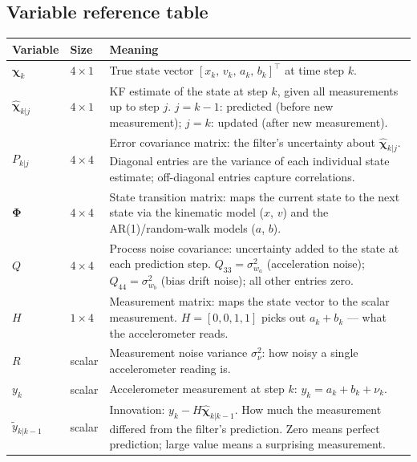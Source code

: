 \documentclass[12pt, a4paper]{article}
\begin{document}
\subsection*{Variable reference table}

\begin{center}
\renewcommand{\arraystretch}{1.5}
\begin{tabular}{p{2.8cm} p{2.0cm} p{8.5cm}}
  \toprule
  \textbf{Variable} & \textbf{Size} & \textbf{Meaning} \\
  \midrule
  $\boldsymbol{\chi}_k$
    & $4 \times 1$
    & True state vector $[x_k,\, v_k,\, a_k,\, b_k]^\top$ at time step $k$. \\
  $\hat{\boldsymbol{\chi}}_{k|j}$
    & $4 \times 1$
    & KF estimate of the state at step $k$, given all measurements up
      to step $j$.
      $j = k-1$: predicted (before new measurement);
      $j = k$: updated (after new measurement). \\
  $P_{k|j}$
    & $4 \times 4$
    & Error covariance matrix: the filter's uncertainty about
      $\hat{\boldsymbol{\chi}}_{k|j}$.
      Diagonal entries are the variance of each individual state
      estimate; off-diagonal entries capture correlations. \\
  $\boldsymbol{\Phi}$
    & $4 \times 4$
    & State transition matrix: maps the current state to the next
      state via the kinematic model ($x$, $v$) and the AR(1)/random-walk
      models ($a$, $b$). \\
  $Q$
    & $4 \times 4$
    & Process noise covariance: uncertainty added to the state at
      each prediction step.
      $Q_{33} = \sigma_{w_a}^2$ (acceleration noise);
      $Q_{44} = \sigma_{w_b}^2$ (bias drift noise);
      all other entries zero. \\
  $H$
    & $1 \times 4$
    & Measurement matrix: maps the state vector to the scalar
      measurement.
      $H = [0,0,1,1]$ picks out $a_k + b_k$ --- what the
      accelerometer reads. \\
  $R$
    & scalar
    & Measurement noise variance $\sigma_\nu^2$:
      how noisy a single accelerometer reading is. \\
  $y_k$
    & scalar
    & Accelerometer measurement at step $k$:
      $y_k = a_k + b_k + \nu_k$. \\
  $\tilde{y}_{k|k-1}$
    & scalar
    & Innovation: $y_k - H\hat{\boldsymbol{\chi}}_{k|k-1}$.
      How much the measurement differed from the filter's prediction.
      Zero means perfect prediction; large value means a surprising
      measurement. \\

\end{tabular}
\end{center}
\end{document}
